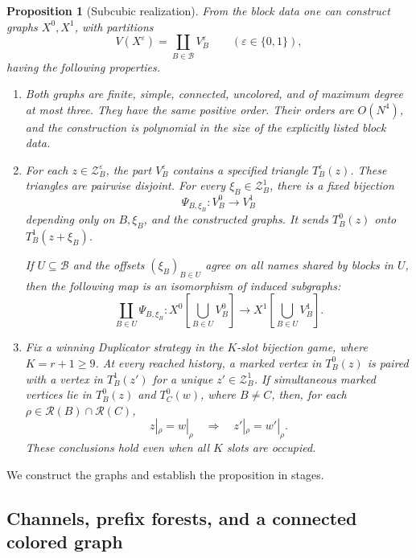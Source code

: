 \documentclass[11pt]{article}
\newtheorem{proposition}[theorem]{Proposition}
\theoremstyle{definition}
\begin{document}
\begin{proposition}[Subcubic realization]
\label{prop:subcubic-realization}
From the block data one can construct graphs \(X^0,X^1\), with
partitions
\[
  V(X^\varepsilon)=\coprod_{B\in\mathcal B}V_B^\varepsilon
  \qquad(\varepsilon\in\{0,1\}),
\]
having the following properties.
\begin{enumerate}
\item
Both graphs are finite, simple, connected, uncolored, and of maximum
degree at most three.  They have the same positive order.
Their orders are \(O(N^4)\), and the construction is polynomial in the
size of the explicitly listed block data.
\item
For each \(z\in\mathcal Z_B^\varepsilon\), the part \(V_B^\varepsilon\) contains a specified
triangle \(T_B^\varepsilon(z)\).  These triangles are pairwise disjoint.
For every \(\xi_B\in\mathcal Z_B^1\), there is a fixed bijection
\[
  \Psi_{B,\xi_B}:V_B^0\longrightarrow V_B^1
\]
depending only on \(B,\xi_B\), and the constructed graphs.  It sends
\(T_B^0(z)\) onto \(T_B^1(z+\xi_B)\).
\par{}
If \(U\subseteq\mathcal B\) and the offsets
\((\xi_B)_{B\in U}\) agree on all names shared by blocks in \(U\), then
the following map is an isomorphism of induced subgraphs:
\[
 \coprod_{B\in U}\Psi_{B,\xi_B}:
 X^0\left[\bigcup_{B\in U}V_B^0\right]
 \longrightarrow
 X^1\left[\bigcup_{B\in U}V_B^1\right].
\]
\item
Fix a winning Duplicator strategy in the \(K\)-slot bijection game,
where \(K=r+1\ge9\).
At every reached history, a marked vertex in \(T_B^0(z)\) is paired
with a vertex in \(T_B^1(z')\) for a unique \(z'\in\mathcal Z_B^1\).
If simultaneous marked vertices lie in \(T_B^0(z)\) and \(T_C^0(w)\),
where \(B\ne C\), then, for each
\(\rho\in\mathcal R(B)\cap\mathcal R(C)\),
\[
     z|_\rho=w|_\rho
     \quad\Longrightarrow\quad
     z'|_\rho=w'|_\rho .
\]
These conclusions hold even when all \(K\) slots are occupied.
\end{enumerate}
\end{proposition}

We construct the graphs and establish the proposition in stages.

\subsection{Channels, prefix forests, and a connected colored graph}
\end{document}
